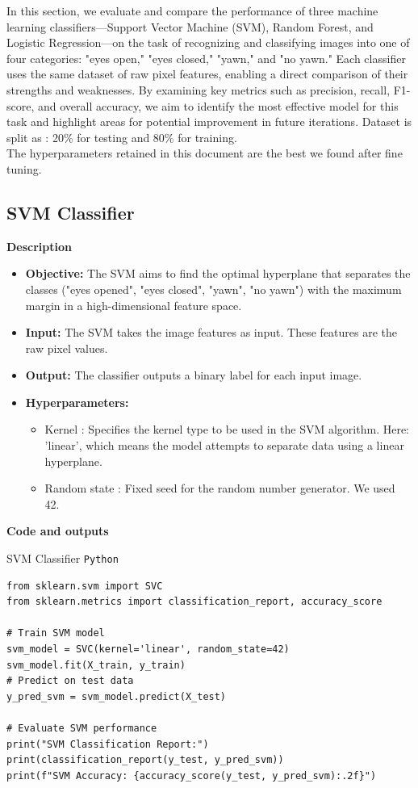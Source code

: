 \documentclass{modeleRapport}
\begin{document}
In this section, we evaluate and compare the performance of three machine learning classifiers—Support Vector Machine (SVM), Random Forest, and Logistic Regression—on the task of recognizing and classifying images into one of four categories: "eyes open," "eyes closed," "yawn," and "no yawn." Each classifier uses the same dataset of raw pixel features, enabling a direct comparison of their strengths and weaknesses. By examining key metrics such as precision, recall, F1-score, and overall accuracy, we aim to identify the most effective model for this task and highlight areas for potential improvement in future iterations. Dataset is split as : 20\% for testing and 80\% for training.
\\The hyperparameters retained in this document are the best we found after fine tuning.
\subsection{SVM Classifier}

\bigskip

\textbf{Description}

\begin{itemize}
    \item \textbf{Objective:} The SVM aims to find the optimal hyperplane that separates the classes ("eyes opened", "eyes closed", "yawn", "no yawn") with the maximum margin in a high-dimensional feature space.

    \item \textbf{Input:} The SVM takes the image features as input. These features are the raw pixel values.

    \item \textbf{Output:} The classifier outputs a binary label for each input image.

    \item \textbf{Hyperparameters:}
    \begin{itemize}
        \item Kernel : Specifies the kernel type to be used in the SVM algorithm. Here: 'linear', which means the model attempts to separate data using a linear hyperplane.
        \item Random state : Fixed seed for the random number generator. We used 42.
    \end{itemize}
\end{itemize}

\textbf{Code and outputs}
\begin{codebox}{SVM Classifier \texttt{Python}}
\begin{lstlisting}
from sklearn.svm import SVC
from sklearn.metrics import classification_report, accuracy_score

# Train SVM model
svm_model = SVC(kernel='linear', random_state=42)
svm_model.fit(X_train, y_train)
# Predict on test data
y_pred_svm = svm_model.predict(X_test)

# Evaluate SVM performance
print("SVM Classification Report:")
print(classification_report(y_test, y_pred_svm))
print(f"SVM Accuracy: {accuracy_score(y_test, y_pred_svm):.2f}")
\end{lstlisting}
\end{codebox}
\end{document}

